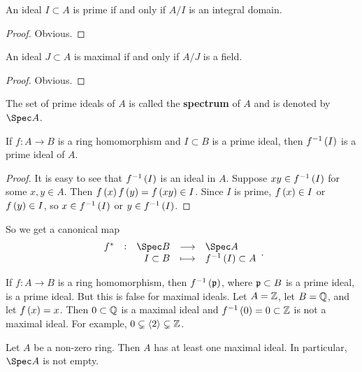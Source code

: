 \begin{lemma}
An ideal $ I \subset A $ is prime if and only if $ A / I $ is an integral domain.
\end{lemma}

\begin{proof}
Obvious.
\end{proof}

\begin{lemma}
An ideal $ J \subset A $ is maximal if and only if $ A / J $ is a field.
\end{lemma}

\begin{proof}
Obvious.
\end{proof}

\begin{definition}
The set of prime ideals of $ A $ is called the \textbf{spectrum} of $ A $ and is denoted by $ \Spec A $.
\end{definition}

\begin{proposition}
If $ f : A \to B $ is a ring homomorphism and $ I \subset B $ is a prime ideal, then $ f^{-1}\br{I} $ is a prime ideal of $ A $.
\end{proposition}

\begin{proof}
It is easy to see that $ f^{-1}\br{I} $ is an ideal in $ A $. Suppose $ xy \in f^{-1}\br{I} $ for some $ x, y \in A $. Then $ f\br{x}f\br{y} = f\br{xy} \in I $. Since $ I $ is prime, $ f\br{x} \in I $ or $ f\br{y} \in I $, so $ x \in f^{-1}\br{I} $ or $ y \in f^{-1}\br{I} $.
\end{proof}

So we get a canonical map
$$ \function[f^*]{\Spec B}{\Spec A}{I \subset B}{f^{-1}\br{I} \subset A}. $$


\begin{remark}
If $ f : A \to B $ is a ring homomorphism, then $ f^{-1}\br{\ppp} $, where $ \mathfrak{p} \subset B $ is a prime ideal, is a prime ideal. But this is false for maximal ideals. Let $ A = \mathbb{Z} $, let $ B = \mathbb{Q} $, and let $ f\br{x} = x $. Then $ 0 \subset \mathbb{Q} $ is a maximal ideal and $ f^{-1}\br{0} = 0 \subset \ZZ $ is not a maximal ideal. For example, $ 0 \subsetneq \left\langle 2 \right\rangle \subsetneq \mathbb{Z} $.
\end{remark}

\begin{theorem}
\label{thm:4.6}
Let $ A $ be a non-zero ring. Then $ A $ has at least one maximal ideal. In particular, $ \Spec A $ is not empty.
\end{theorem}


